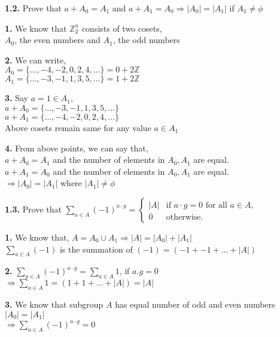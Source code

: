 \documentclass [12pt]{article}
\theoremstyle{definition}
\newcommand{\iz}[1]{\mathds{#1}^{n}}
\newcommand{\md}[1]{|#1|}
\begin{document}
{\bf 1.2.} Prove that $a + A_{0} = A_{1}$ and $a + A_{1} = A_{0} \Rightarrow \md{A_{0}}=\md{A_{1}}$ if $A_{1}  \neq \phi$

\phantom{1em} {\bf 1.} We know that $\iz{Z}_{2}$ consists of two cosets,\\
\phantom{1000em} $A_{0}$, the even numbers and $A_{1}$, the odd numbers

\phantom{1em} {\bf 2.} We can write,\\
\phantom{1000em} $A_{0} = \{ \dots ,-4, -2, 0, 2, 4, \dots \} = 0 + 2\mathds{Z}$\\
\phantom{1000em} $A_{1} = \{ \dots ,-3, -1, 1, 3, 5, \dots \} = 1 + 2\mathds{Z}$ 

\phantom{1em} {\bf 3.} Say $ a = 1 \in A_{1}$,\\
\phantom{1000em} $a + A_{0} = \{ \dots, -3, -1, 1, 3, 5, \dots \}$\\
\phantom{1000em} $a + A_{1} = \{ \dots, -4, -2, 0, 2, 4, \dots \}$\\
\phantom{1000em} Above cosets remain same for any value $a \in A_{1}$

\phantom{1em} {\bf 4.} From above points, we can say that,\\
\phantom{1000em} $a + A_{0} = A_{1}$ and the number of elements in $A_{0}, A_{1}$ are equal. \\
\phantom{1000em} $a + A_{1} = A_{0}$ and the number of elements in $A_{0}, A_{1}$ are equal. \\
\phantom{1000em} $\Rightarrow \md{A_{0}} = \md{A_{1}}$ where $\md{A_{1}} \neq \phi$

{\bf 1.3.} Prove that $\sum_{a\in A} (-1)^{a\cdot g} = 
	\begin{cases}
   		|A| & \text{if } a\cdot g = 0 \text{ for all } a\in A, \\
     	0   & \text{otherwise}.
    \end{cases}$
    
\phantom{1em} {\bf 1.} We know that, $A = A_{0} \cup A_{1} \Rightarrow \md{A} = \md{A_{0}} + \md{A_{1}}$\\
\phantom{1000em} $\sum_{a\in A} (-1)$ is the summation of $(-1) = (-1 + -1 + \dots + \md{A})$

\phantom{1em} {\bf 2.} $\sum_{a\in A} (-1)^{a\cdot g} = \sum_{a\in A} 1$, if $a.g=0$\\
\phantom{1000em} $\Rightarrow \sum_{a \in A} 1 = (1 + 1 + \dots + \md{A}) = \md{A}$

\phantom{1em} {\bf 3.} We know that subgroup $A$ has equal number of odd and even numbers\\
\phantom{1000em} $\md{A_{0}} = \md{A_{1}}$ \\
\phantom{1000em} $\Rightarrow \sum_{a\in A} (-1)^{a\cdot g} = 0$
\end{document}
